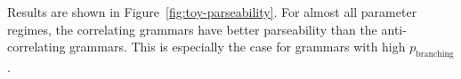 \documentclass[10pt,twoside,lineno]{article}
\begin{document}
Results are shown in Figure~\ref{fig:toy-parseability}. For almost all parameter regimes, the correlating grammars have better parseability than the anti-correlating grammars. This is especially the case for grammars with high $p_\text{branching}$. 


\nocite{diessel2001ordering, dryer1980positional, wals} 




\end{document}
